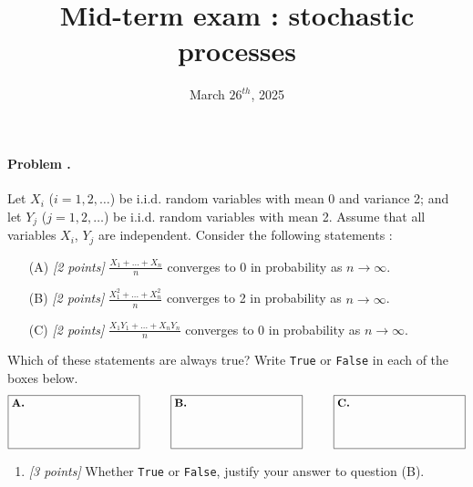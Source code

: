 \documentclass[article,12pt,a4paper]{article}
\title{ \bfseries \Huge {Mid-term exam : stochastic processes}}
\date{March $26^{th}$, 2025}
\newcounter{num}  %
\begin{document}
	
	\setcounter{num}{1}  %
		
		\paragraph{Problem \thenum.}
		Let $X_i$ ($i = 1, 2, \dots$) be i.i.d. random variables with mean 0 and variance 2; and let $Y_j$ ($j = 1, 2, \dots$) be i.i.d. random variables with mean 2. Assume that all variables $X_i$, $Y_j$ are independent. Consider the following statements :
		
		\begin{enumerate}
			\item[(A)] \textit{[2 points]} $\frac{X_1 + \dots + X_n}{n}$ converges to 0 in probability as $n \to \infty$.
			\item[(B)] \textit{[2 points]} $\frac{X_1^2 + \dots + X_n^2}{n}$ converges to 2 in probability as $n \to \infty$.
			\item[(C)] \textit{[2 points]} $\frac{X_1 Y_1 + \dots + X_n Y_n}{n}$ converges to 0 in probability as $n \to \infty$.
		\end{enumerate}
		
		Which of these statements are always true? Write \texttt{True} or \texttt{False} in each of the boxes below.
		\[
		\fbox{\parbox[c][1.5cm][t]{4cm}{\textbf{A.} \hspace{0.5cm}}} \hspace{1cm} 
		\fbox{\parbox[c][1.5cm][t]{4cm}{\textbf{B.} \hspace{0.5cm}}} \hspace{1cm} 
		\fbox{\parbox[c][1.5cm][t]{4cm}{\textbf{C.} \hspace{0.5cm}}}
		\]
		
		\begin{enumerate}
			\item \textit{[3 points]} Whether \texttt{True} or \texttt{False}, justify your answer to question (B).
		\end{enumerate}
		
		
		\newpage
		
\end{document}

